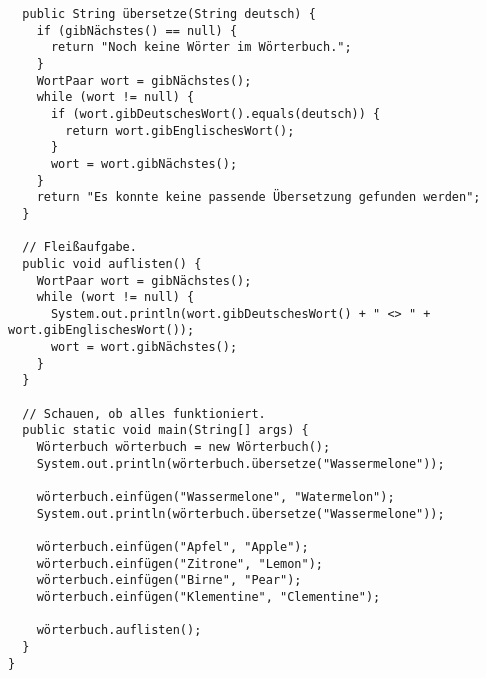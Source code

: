 \documentclass{lehramt-informatik-haupt}
\begin{document}
\begin{itemize}
\begin{verbatim}
  public String übersetze(String deutsch) {
    if (gibNächstes() == null) {
      return "Noch keine Wörter im Wörterbuch.";
    }
    WortPaar wort = gibNächstes();
    while (wort != null) {
      if (wort.gibDeutschesWort().equals(deutsch)) {
        return wort.gibEnglischesWort();
      }
      wort = wort.gibNächstes();
    }
    return "Es konnte keine passende Übersetzung gefunden werden";
  }

  // Fleißaufgabe.
  public void auflisten() {
    WortPaar wort = gibNächstes();
    while (wort != null) {
      System.out.println(wort.gibDeutschesWort() + " <> " + wort.gibEnglischesWort());
      wort = wort.gibNächstes();
    }
  }

  // Schauen, ob alles funktioniert.
  public static void main(String[] args) {
    Wörterbuch wörterbuch = new Wörterbuch();
    System.out.println(wörterbuch.übersetze("Wassermelone"));

    wörterbuch.einfügen("Wassermelone", "Watermelon");
    System.out.println(wörterbuch.übersetze("Wassermelone"));

    wörterbuch.einfügen("Apfel", "Apple");
    wörterbuch.einfügen("Zitrone", "Lemon");
    wörterbuch.einfügen("Birne", "Pear");
    wörterbuch.einfügen("Klementine", "Clementine");

    wörterbuch.auflisten();
  }
}
\end{verbatim}
\end{itemize}
\end{document}
